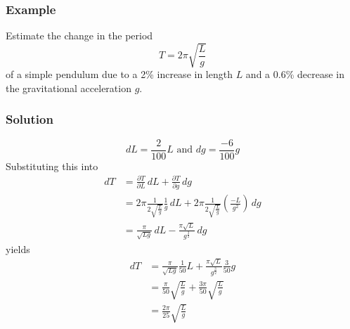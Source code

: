 \documentclass[11pt]{article}
\begin{document}
\subsubsection{Example}
Estimate the change in the period
\[ T = 2\pi \sqrt{\frac{L}{g}} \]
of a simple pendulum due to a 2\% increase in length $L$ and a 0.6\% decrease in the gravitational acceleration $g$.

\subsubsection{Solution}
\[ dL = \frac{2}{100}L \text{ and } dg = \frac{-6}{100}g \]
Substituting this into
\begin{align*}
dT &= \frac{\partial T}{\partial L}\, dL + \frac{\partial T}{\partial g}\, dg \\
&= 2\pi \frac{1}{2 \sqrt{\frac{L}{g}}} \frac{1}{g}\, dL + 2\pi \frac{1}{2 \sqrt{\frac{L}{g}}} \left( \frac{-L}{g^2} \right)\, dg \\
&= \frac{\pi}{\sqrt{Lg}}\, dL - \frac{\pi \sqrt{L}}{g^{\frac{3}{2}}}\, dg 
\end{align*}
yields
\begin{align*}
dT &= \frac{\pi}{\sqrt{Lg}} \frac{1}{50}L + \frac{\pi \sqrt{L}}{g^{\frac{3}{2}}} \frac{3}{50}g \\
&= \frac{\pi}{50} \sqrt{\frac{L}{g}} + \frac{3 \pi}{50} \sqrt{\frac{L}{g}} \\
&=  \frac{2\pi}{25} \sqrt{\frac{L}{g}} 
\end{align*}
\end{document}
